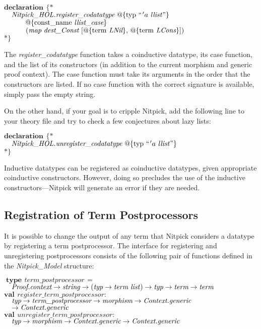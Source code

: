 \documentclass[a4paper,12pt]{article}
\begin{document}
\prew
$\textbf{declaration}~\,\{{*}$ \\
$\hbox{}\quad\textit{Nitpick\_HOL.register\_codatatype}~@\{\textrm{typ}~``\kern1pt'a~\textit{llist\/}\textrm{''}\}$ \\
$\hbox{}\qquad\quad @\{\textrm{const\_name}~ \textit{llist\_case}\}$ \\
$\hbox{}\qquad\quad (\textit{map}~\textit{dest\_Const}~[@\{\textrm{term}~\textit{LNil}\},\, @\{\textrm{term}~\textit{LCons}\}])$ \\
${*}\}$
\postw

The \textit{register\_codatatype} function takes a coinductive datatype, its
case function, and the list of its constructors (in addition to the current
morphism and generic proof context). The case function must take its arguments
in the order that the constructors are listed. If no case function with the
correct signature is available, simply pass the empty string.

On the other hand, if your goal is to cripple Nitpick, add the following line to
your theory file and try to check a few conjectures about lazy lists:

\prew
$\textbf{declaration}~\,\{{*}$ \\
$\hbox{}\quad\textit{Nitpick\_HOL.unregister\_codatatype}~@\{\textrm{typ}~``\kern1pt'a~\textit{llist\/}\textrm{''}\}$ \\
${*}\}$
\postw

Inductive datatypes can be registered as coinductive datatypes, given
appropriate coinductive constructors. However, doing so precludes
the use of the inductive constructors---Nitpick will generate an error if they
are needed.

\subsection{Registration of Term Postprocessors}
\label{registration-of-term-postprocessors}

It is possible to change the output of any term that Nitpick considers a
datatype by registering a term postprocessor. The interface for registering and
unregistering postprocessors consists of the following pair of functions defined
in the \textit{Nitpick\_Model} structure:

\prew
$\textbf{type}\,~\textit{term\_postprocessor}\,~{=} {}$ \\
$\hbox{}\quad\textit{Proof.context} \rightarrow \textit{string} \rightarrow (\textit{typ} \rightarrow \textit{term~list\/}) \rightarrow \textit{typ} \rightarrow \textit{term} \rightarrow \textit{term}$ \\
$\textbf{val}\,~\textit{register\_term\_postprocessor} : {}$ \\
$\hbox{}\quad\textit{typ} \rightarrow \textit{term\_postprocessor} \rightarrow \textit{morphism} \rightarrow \textit{Context.generic}$ \\
$\hbox{}\quad{\rightarrow}\; \textit{Context.generic}$ \\
$\textbf{val}\,~\textit{unregister\_term\_postprocessor} : {}$ \\
$\hbox{}\quad\textit{typ} \rightarrow \textit{morphism} \rightarrow \textit{Context.generic} \rightarrow \textit{Context.generic}$
\postw
\end{document}
